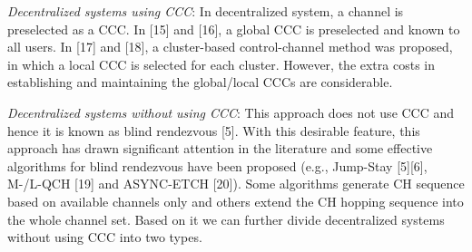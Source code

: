 \documentclass[journal]{IEEEtran}
\begin{document}
\par \emph{Decentralized systems using CCC}: In decentralized system, a channel is preselected as a CCC. In [15] and [16], a global CCC is preselected and known to all users. In [17] and [18], a cluster-based control-channel method was proposed, in which a local CCC is selected for each cluster. However, the extra costs in establishing and maintaining the global/local CCCs are considerable.
\par \emph{Decentralized systems without using CCC}: This approach does not use CCC and hence it is known as blind rendezvous [5]. With this desirable feature, this approach has drawn significant attention in the literature and some effective algorithms for blind rendezvous have been proposed (e.g., Jump-Stay [5][6], M-/L-QCH [19] and ASYNC-ETCH [20]). Some algorithms generate CH sequence based on available channels only and others extend the CH hopping sequence into the whole channel set. Based on it we can further divide decentralized systems without using CCC into two types.
\end{document}
